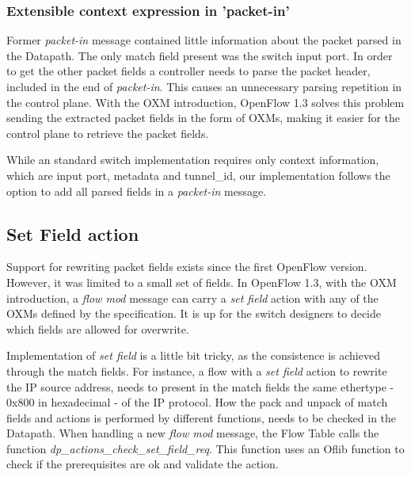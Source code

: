    \subsubsection{Extensible context expression in ’packet-in’}
    
    Former \textit{packet-in} message contained little information about the packet parsed in the Datapath. The only match field present was the switch input port. In order to get the other packet fields a controller needs to parse the packet header, included in the end of \textit{packet-in}. This causes an unnecessary parsing repetition in the control plane. With the OXM introduction, OpenFlow 1.3 solves this problem sending the extracted packet fields in the form of OXMs, making it easier for the control plane to retrieve the packet fields.  
    
    While an standard switch implementation requires only context information, which are input port, metadata and tunnel_id, our implementation follows the option to add all parsed fields in a \textit{packet-in} message.    

\subsection{Set Field action}
\label{sec:sec43}    

Support for rewriting packet fields exists since the first OpenFlow version. However, it was limited to a small set of fields. In OpenFlow 1.3, with the OXM introduction, a \textit{flow mod} message can carry a  \textit{set field} action with any of the OXMs defined by the specification. It is up for the switch designers to decide which fields are allowed for overwrite.   

Implementation of \textit{set field} is a little bit tricky, as the consistence is achieved through the match fields. For instance, a flow with a \textit{set field} action to rewrite the IP source address, needs to present in the match fields the same ethertype - 0x800 in hexadecimal - of the IP protocol. How the pack and unpack of match fields and actions is performed by different functions, needs to be checked in the Datapath. When handling a new \textit{flow mod} message, the Flow Table calls the function \textit{dp_actions_check_set_field_req}. This function uses an Oflib function to check if the prerequisites are ok and validate the action.


